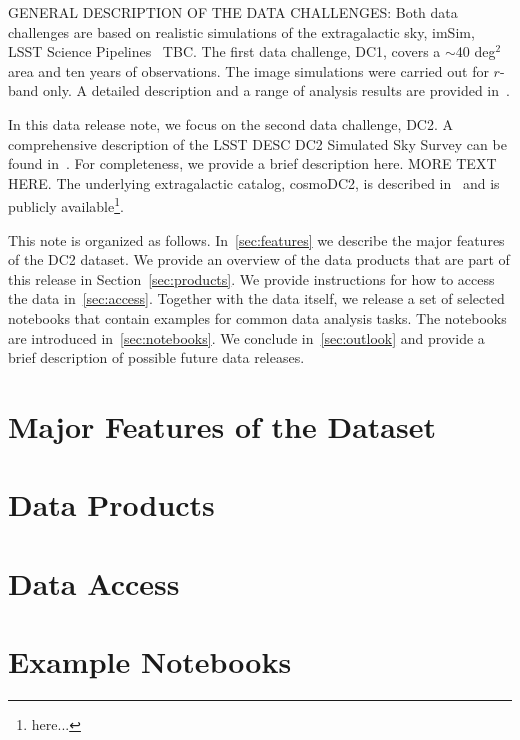 \documentclass[11pt]{report}
\begin{document}
GENERAL DESCRIPTION OF THE DATA CHALLENGES: Both data challenges are based on realistic simulations of the extragalactic sky, imSim, LSST Science Pipelines~\citep{2017ASPC..512..279J} TBC. The first data challenge, DC1, covers a $\sim$40 deg$^2$ area and ten years of observations. The image simulations were carried out for $r$-band only. A detailed description and a range of analysis results are provided in~\cite{dc1}. 

In this data release note, we focus on the second data challenge, DC2. A comprehensive description of the LSST DESC DC2 Simulated Sky Survey can be found in~\cite{2020arXiv201005926L}. For completeness, we provide a brief description here. MORE TEXT HERE. The underlying extragalactic catalog, cosmoDC2, is described in~\cite{korytov} and is publicly available\footnote{here...}.



This note is organized as follows. In~\autoref{sec:features} we describe the major features of the DC2 dataset.
We provide an overview of the data products that are part of this release in Section~\autoref{sec:products}.
We provide instructions for how to access the data in~\autoref{sec:access}.
Together with the data itself, we release a set of selected notebooks that contain examples for common data analysis tasks.
The notebooks are introduced in~\autoref{sec:notebooks}.
We conclude in~\ref{sec:outlook} and provide a brief description of possible future data releases. 

\section{Major Features of the Dataset}
\label{sec:features}

\section{Data Products}
\label{sec:products}

\section{Data Access}
\label{sec:access}

\section{Example Notebooks}
\label{sec:notebooks}
\end{document}
